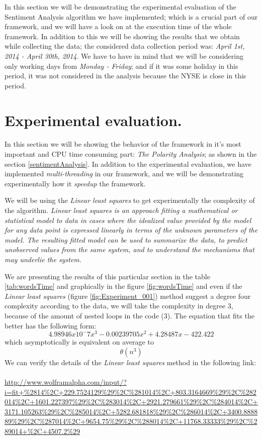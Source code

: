 In this section we will be demonstrating the experimental evaluation of the Sentiment Analysis algorithm we have implemented; which is a crucial part of our framework, and we will have a look on at the execution time of the whole framework. In addition to this we will be showing the results that we obtain while collecting the data; the considered data collection period was: \emph{April 1st, 2014 - April 30th, 2014}. We have to have in mind that we will be considering only working days from \emph{Monday - Friday}; and if it was some holiday in this period, it was not considered in the analysis because the \gls{NYSE} is close in this period.

\section{Experimental evaluation.}

In this section we will be showing the behavior of the framework in it's most important and CPU time consuming part: \emph{The Polarity Analysis}; as shown in the section \ref{sentimentAnalysis}. In addition to the experimental evaluation, we have implemented \emph{multi-threading} in our framework, and we will be demonstrating experimentally how it \emph{speedup} the framework.

We will be using the \emph{Linear least squares} to get experimentally the complexity of the algorithm. \emph{Linear least squares \cite{L2014} is an approach fitting a mathematical or statistical model to data in cases where the idealized value provided by the model for any data point is expressed linearly in terms of the unknown parameters of the model. The resulting fitted model can be used to summarize the data, to predict unobserved values from the same system, and to understand the mechanisms that may underlie the system.}

We are presenting the results of this particular section in the table \ref{tab:wordsTime} and graphically in the figure \ref{fig:wordsTime} and even if the \emph{Linear least squares} (figure \ref{fig:Experiment_001}) method suggest a degree four complexity according to the data, we will take the complexity in degree 3, because of the amount of nested loops in the code (3). The equation that fits the better has the following form: 
\[4.98946x10^-7 x^3-0.00239705 x^2+4.28487 x-422.422\] 
which asymptotically is equivalent on average to 
\[\theta(n^3)\] 
We can verify the details of the \emph{Linear least squares} method in the following link:
\\\\
\url{http://www.wolframalpha.com/input/?i=fit+%2814%2C+229.7524129%29%2C%281014%2C+803.3164669%29%2C%282014%2C+1601.227397%29%2C%283014%2C+2921.279661%29%2C%284014%2C+3171.105263%29%2C%285014%2C+5282.681818%29%2C%286014%2C+3400.888889%29%2C%287014%2C+9654.75%29%2C%288014%2C+11768.33333%29%2C%289014+%2C+4507.2%29}

